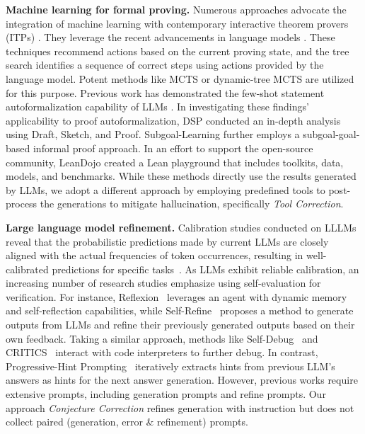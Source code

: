 \documentclass{article} \usepackage{iclr2024_conference,times}
\def\methodOneFull{\textit{Tool Correction}\xspace}
\def\methodTwoFull{\textit{Conjecture Correction}\xspace}
\begin{document}
\textbf{Machine learning for formal proving.} Numerous approaches advocate the integration of machine learning with contemporary interactive theorem provers (ITPs) \citep{yang2019learning, gauthier2021tactictoe}. They leverage the recent advancements in language models \citep{polu2020generative, han2021proof, polu2023formal, jiang2022thor, lample2022hypertree, mikula2023magnushammer}. These techniques recommend actions based on the current proving state, and the tree search identifies a sequence of correct steps using actions provided by the language model. Potent methods like MCTS \citep{silver2018general, wu2021tacticzero, laurent2022learning} or dynamic-tree MCTS \citep{wang2023dt} are utilized for this purpose. Previous work \citep{wu2022autoformalization} has demonstrated the few-shot statement autoformalization capability of LLMs \citep{chowdhery2022palm}. In investigating these findings' applicability to proof autoformalization, DSP \citep{jiang2023draft} conducted an in-depth analysis using Draft, Sketch, and Proof. Subgoal-Learning \citep{zhao2023decomposing} further employs a subgoal-goal-based informal proof approach. In an effort to support the open-source community, LeanDojo \citep{yang2023leandojo} created a Lean playground that includes toolkits, data, models, and benchmarks. 
While these methods directly use the results generated by LLMs, we adopt a different approach by employing predefined tools to post-process the generations to mitigate hallucination, specifically \methodOneFull.

\textbf{Large language model refinement.}
Calibration studies conducted on LLLMs reveal that the probabilistic predictions made by current LLMs are closely aligned with the actual frequencies of token occurrences, resulting in well-calibrated predictions for specific tasks~\citep{guo2017calibration,kadavath2022language,jiang2020can}. As LLMs exhibit reliable calibration, an increasing number of research studies emphasize using self-evaluation for verification. For instance, Reflexion~\citep{shinn2023reflexion} leverages an agent with dynamic memory and self-reflection capabilities, while Self-Refine~\citep{madaan2023selfrefine} proposes a method to generate outputs from LLMs and refine their previously generated outputs based on their own feedback. Taking a similar approach, methods like Self-Debug~\citep{chen2023teaching} and CRITICS~\citep{gou2023critic} interact with code interpreters to further debug. In contrast, Progressive-Hint Prompting~\citep{zheng2023progressive} iteratively extracts hints from previous LLM's answers as hints for the next answer generation. However, previous works require extensive prompts, including generation prompts and refine prompts. Our approach \methodTwoFull  refines generation with instruction but does not
collect paired (generation, error \& refinement) prompts.
\end{document}
